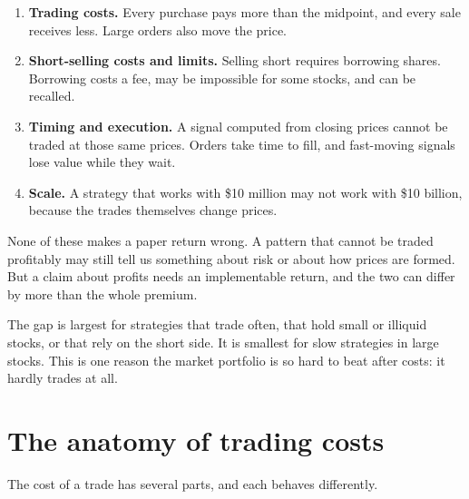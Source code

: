 \begin{enumerate}
  \item \textbf{Trading costs.} Every purchase pays more than the midpoint, and every sale receives less. Large orders also move the price.
  \item \textbf{Short-selling costs and limits.} Selling short requires borrowing shares. Borrowing costs a fee, may be impossible for some stocks, and can be recalled.
  \item \textbf{Timing and execution.} A signal computed from closing prices cannot be traded at those same prices. Orders take time to fill, and fast-moving signals lose value while they wait.
  \item \textbf{Scale.} A strategy that works with \$10 million may not work with \$10 billion, because the trades themselves change prices.
\end{enumerate}

None of these makes a paper return wrong. A pattern that cannot be traded profitably may still tell us something about risk or about how prices are formed. But a claim about profits needs an implementable return, and the two can differ by more than the whole premium.

The gap is largest for strategies that trade often, that hold small or illiquid stocks, or that rely on the short side. It is smallest for slow strategies in large stocks. This is one reason the market portfolio is so hard to beat after costs: it hardly trades at all.

\section{The anatomy of trading costs}
\label{sec:04-anatomy}

The cost of a trade has several parts, and each behaves differently.

